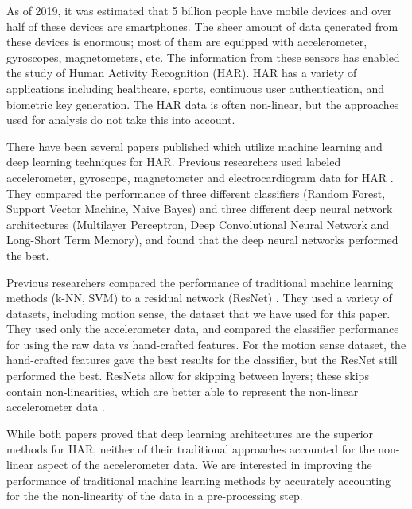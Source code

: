 As of 2019, it was estimated that 5 billion people have mobile devices and over half of these devices are smartphones. The sheer amount of data generated from these devices is enormous; most of them are equipped with accelerometer, gyroscopes, magnetometers, etc. The information from these sensors has enabled  the study of Human Activity Recognition (HAR). HAR has a variety of applications including healthcare, sports, continuous user authentication, and biometric key generation. The HAR data is often non-linear, but the approaches used for analysis do not take this into account.

There have been several papers published which utilize machine learning and deep learning techniques for HAR. Previous researchers used labeled accelerometer, gyroscope, magnetometer and electrocardiogram data for HAR \cite{masum2019human}. They compared the performance of three different classifiers (Random Forest, Support Vector Machine, Naive Bayes) and three different deep neural network architectures (Multilayer Perceptron, Deep Convolutional Neural Network and Long-Short Term Memory), and found that the deep neural networks performed the best. 

Previous researchers compared the performance of traditional machine learning methods (k-NN, SVM) to a residual network (ResNet) \cite{ferrari2019hand}. They used a variety of datasets, including motion sense, the dataset that we have used for this paper. They used only the accelerometer data, and compared the classifier performance for using the raw data vs hand-crafted features. For the motion sense dataset, the hand-crafted features gave the best results for the classifier, but the ResNet still performed the best. ResNets allow for skipping between layers; these skips contain non-linearities, which are better able to represent the non-linear accelerometer data \cite{he2016deep}.

While both papers proved that deep learning architectures are the superior methods for HAR, neither of their traditional approaches accounted for the non-linear aspect of the accelerometer data. We are interested in improving the performance of traditional machine learning methods by accurately accounting for the the non-linearity of the data in a pre-processing step. 
